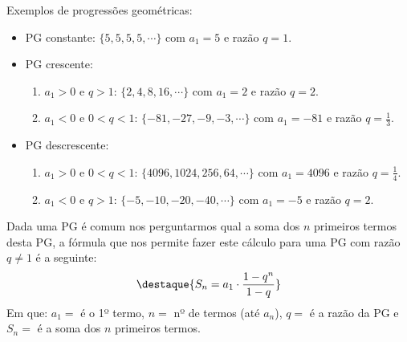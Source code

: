  \begin{exem} Exemplos de progressões geométricas:
  \begin{itemize}
   \item PG constante: $\{5, 5, 5, 5, \cdots\}$ com $a_1= 5$ e razão $q= 1$.
   \item PG crescente:
   \begin{enumerate}
   \item $a_1 > 0$ e $q > 1$: $\{2, 4, 8, 16, \cdots\}$ com $a_1= 2$ e razão $q= 2$.
   \item $a_1 < 0$ e $0 < q < 1$: $\{-81, -27, -9, -3, \cdots\}$ com $a_1= -81$ e razão $q= \frac{1}{3}$.
   \end{enumerate}
   \item PG descrescente:
    \begin{enumerate}
   \item $a_1 > 0$ e $0 < q < 1$: $\{4096, 1024, 256, 64, \cdots\}$ com $a_1= 4096$ e razão $q= \frac{1}{4}$.
   \item $a_1 < 0$ e $q > 1$: $\{-5, -10, -20, -40, \cdots\}$ com $a_1= -5$ e razão $q= 2$.
   \end{enumerate}
  \end{itemize}
 \end{exem}

 Dada uma PG é comum nos perguntarmos qual a soma dos $n$ primeiros termos desta PG, a fórmula que nos permite fazer este cálculo para uma PG com razão $q \neq 1$ é a seguinte:
 \[\destaque{S_n= a_1 \cdot \frac{ 1 - q^n}{1 - q}}\]
 Em que: $a_1=$ é o 1º termo, $n=$ nº de termos (até $a_n$), $q=$ é a razão da PG e $S_n=$ é a soma dos $n$ primeiros termos.

\newpage
